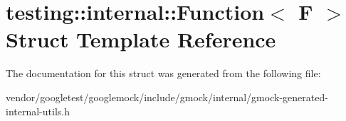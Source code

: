 \hypertarget{structtesting_1_1internal_1_1_function}{}\section{testing\+:\+:internal\+:\+:Function$<$ F $>$ Struct Template Reference}
\label{structtesting_1_1internal_1_1_function}


The documentation for this struct was generated from the following file\+:\begin{DoxyCompactItemize}
\item 
vendor/googletest/googlemock/include/gmock/internal/gmock-\/generated-\/internal-\/utils.\+h\end{DoxyCompactItemize}

